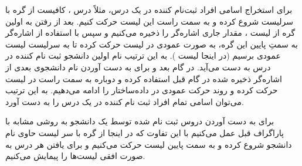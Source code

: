 برای استخراج اسامی افراد ثبت‌نام کننده در یک درس، مثلاً درس {} ، کافیست از گره با سرلیست {} شروع کرده و به سمت راست این لیست حرکت کنیم. بعد از رفتن به اولین گره از لیست {} ، مقدار جاری اشاره‌گر را ذخیره می‌کنیم و سپس با استفاده از اشاره‌گر به سمتِ پایین این گره، به صورت عمودی در لیست حرکت کرده تا به سرلیست لیست عمودی برسیم (در اینجا لیست {}). به این ترتیب نام اولین دانشجو ثبت نام کننده در درس {} به دست می‌‌آید. در گام بعد و برای به دست آوردن نام دانشجوی بعدی از اشاره‌گر ذخیره شده در گام قبل استفاده کرده و دوباره به سمت راست در لیست {} حرکت کرده و روند حرکت عمودی در داده‌ساختار را ادامه می‌دهیم. به این ترتیب می‌توان اسامی تمام افراد ثبت نام کننده در یک درس را به دست آورد.

برای به دست آوردن دروس ثبت نام شده توسط یک دانشجو به روشی مشابه با پاراگراف قبل عمل می‌کنیم با این تفاوت که در اینجا از گره با سر لیست حاوی نام دانشجو شروع کرده و به سمت پایین لیست حرکت می‌کنیم و برای یافتن هر درس به صورت افقی لیست‌ها را پیمایش می‌کنیم.
